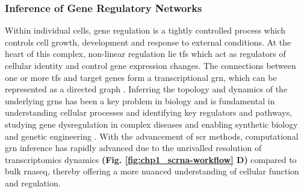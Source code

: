 \subsubsection{Inference of Gene Regulatory Networks}
\par Within individual cells, gene regulation is a tightly controlled process which controls cell growth, development and response to external conditions. At the heart of this complex, non-linear regulation lie \glspl{tf} which act as regulators of cellular identity and control gene expression changes. The connections between one or more \glspl{tf} and target genes form a transcriptional \gls{grn}, which can be represented as a directed graph \textbf{\cite{skok_gibbs_high-performance_2022}}. Inferring the topology and dynamics of the underlying \glspl{grn} has been a key problem in biology and is fundamental in understanding cellular processes and identifying key regulators and pathways, studying gene dysregulation in complex diseases and enabling synthetic biology and genetic engineering \textbf{\cite{lueckenmalte_d_current_2019,skok_gibbs_high-performance_2022,huang_scgrn_2024}}. With the advancement of \gls{scr} methods, computational \gls{grn} inference has rapidly advanced due to the unrivalled resolution of transcriptomics dynamics \textbf{(Fig. \ref{fig:chp1_scrna-workflow} D)} \textbf{\cite{kim_review_2024}} compared to bulk \gls{rnaseq}, thereby offering a more nuanced understanding of cellular function and regulation.\\




